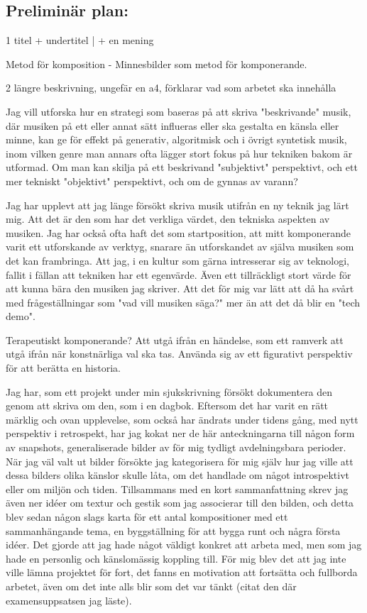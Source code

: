 \documentclass{article}
\begin{document}
\subsection{Preliminär plan:}

1 titel + undertitel | + en mening

	Metod för komposition 
	- Minnesbilder som metod för komponerande.

	

2 längre beskrivning, ungefär en a4, förklarar vad som arbetet ska innehålla

Jag vill utforska hur en strategi som baseras på att skriva "beskrivande" musik, där musiken på ett eller
annat sätt influeras eller ska gestalta en känsla eller minne, kan ge för effekt på generativ, algoritmisk och
i övrigt syntetisk musik, inom vilken genre man annars ofta lägger stort fokus på hur tekniken bakom är
utformad. Om man kan skilja på ett beskrivand "subjektivt" perspektivt, och ett mer tekniskt "objektivt"
perspektivt, och om de gynnas av varann?

Jag har upplevt att jag länge försökt skriva musik utifrån en ny teknik jag lärt mig. Att det är den som har
det verkliga värdet, den tekniska aspekten av musiken. Jag har också ofta haft det som startposition, att mitt
komponerande varit ett utforskande av verktyg, snarare än utforskandet av själva musiken som det kan
frambringa. Att jag, i en kultur som gärna intresserar sig av teknologi, fallit i fällan att tekniken har ett
egenvärde. Även ett tillräckligt stort värde för att kunna bära den musiken jag skriver. Att det för mig var
lätt att då ha svårt med frågeställningar som "vad vill musiken säga?" mer än att det då blir en "tech demo".


Terapeutiskt komponerande? Att utgå ifrån en händelse, som ett ramverk att utgå ifrån när konstnärliga val ska
tas. Använda sig av ett figurativt perspektiv för att berätta en historia.

Jag har, som ett projekt under min sjukskrivning försökt dokumentera den genom att skriva om den, som i en
dagbok. Eftersom det har varit en rätt märklig och ovan upplevelse, som också har ändrats under tidens gång,
med nytt perspektiv i retrospekt, har jag kokat ner de här anteckningarna till någon form av snapshots,
generaliserade bilder av för mig tydligt avdelningsbara perioder. När jag väl valt ut bilder försökte jag
kategorisera för mig själv hur jag ville att dessa bilders olika känslor skulle låta, om det handlade om något
introspektivt eller om miljön och tiden. Tillsammans med en kort sammanfattning skrev jag även ner idéer om
textur och gestik som jag associerar till den bilden, och detta blev sedan någon slags karta för ett antal
kompositioner med ett sammanhängande tema, en byggställning för att bygga runt och några första idéer. Det
gjorde att jag hade något väldigt konkret att arbeta med, men som jag hade en personlig och känslomässig
koppling till. För mig blev det att jag inte ville lämna projektet för fort, det fanns en motivation att
fortsätta och fullborda arbetet, även om det inte alls blir som det var tänkt (citat den där examensuppsatsen
jag läste).
\end{document}
